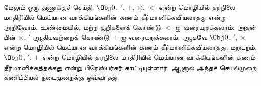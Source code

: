\documentclass[../../../include/open-logic-section]{subfiles}
\begin{document}
மேலும் ஒரு துணுக்குச் செய்தி. $\Obj 0$, $'$, $+$, $\times$, $<$ என்ற
மொழியில் தரநிலை மாதிரியில் மெய்யான வாக்கியங்களின் கணம்
தீர்மானிக்கவியலாதது என்று அறிவோம். உண்மையில், மற்ற குறிகளைக் கொண்டு
$<$ ஐ வரையறுக்கலாம்; அதன் பின் $\times$, $'$ ஆகியவற்றைக் கொண்டு~$+$ ஐ
வரையறுக்கலாம். ஆகவே $\Obj 0$, $'$, $\times$ என்ற மொழியில் மெய்யான
வாக்கியங்களின் கணம் தீர்மானிக்கவியலாதது. மறுபுறம், $\Obj 0$, $'$, $+$
என்ற மொழியில் தரநிலை மாதிரியில் மெய்யான வாக்கியங்களின் கணம்
தீர்மானிக்கத்தக்கது என்று பிரெஸ்பர்கர் காட்டியுள்ளார். ஆனால் அந்தச்
செயல்முறை கணிப்பியல் நடைமுறைக்கு ஒவ்வாதது.
\end{document}

